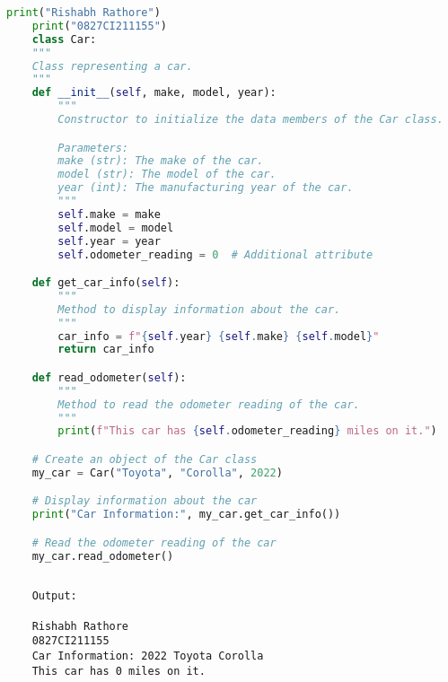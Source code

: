 \documentclass{report}
\begin{document}
\begin{lstlisting}[language=Python]
	print("Rishabh Rathore")
	print("0827CI211155")
	class Car:
    """
    Class representing a car.
    """
    def __init__(self, make, model, year):
        """
        Constructor to initialize the data members of the Car class.

        Parameters:
        make (str): The make of the car.
        model (str): The model of the car.
        year (int): The manufacturing year of the car.
        """
        self.make = make
        self.model = model
        self.year = year
        self.odometer_reading = 0  # Additional attribute

    def get_car_info(self):
        """
        Method to display information about the car.
        """
        car_info = f"{self.year} {self.make} {self.model}"
        return car_info

    def read_odometer(self):
        """
        Method to read the odometer reading of the car.
        """
        print(f"This car has {self.odometer_reading} miles on it.")

	# Create an object of the Car class
	my_car = Car("Toyota", "Corolla", 2022)

	# Display information about the car
	print("Car Information:", my_car.get_car_info())

	# Read the odometer reading of the car
	my_car.read_odometer()
  

\end{lstlisting}

\begin{verbatim}
	Output:

	Rishabh Rathore
	0827CI211155
	Car Information: 2022 Toyota Corolla
	This car has 0 miles on it.
	

\end{verbatim}


\newpage
\end{document}
